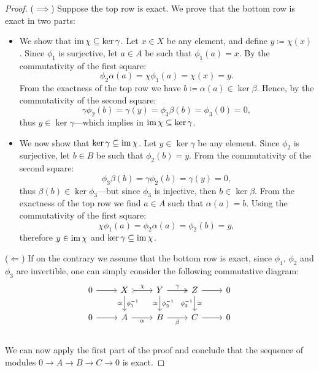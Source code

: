 \begin{proof}
    (\(\implies\)) Suppose the top row is exact. We prove that the bottom row is
    exact in two parts:
    \begin{itemize}\setlength\itemsep{0em}
        \item We show that \(\operatorname{im} \chi \subseteq \ker \gamma\). Let \(x \in X\) be any
              element, and define \(y \coloneq \chi(x)\). Since \(\phi_1\) is surjective,
              let \(a \in A\) be such that \(\phi_1(a) = x\). By the commutativity of the
              first square:
              \[
                  \phi_2 \alpha(a) = \chi \phi_1(a) = \chi(x) = y.
              \]
              From the exactness of the top row we have \(b \coloneq \alpha(a) \in \ker
              \beta\). Hence, by the commutativity of the second square:
              \[
                  \gamma \phi_2(b) = \gamma(y) = \phi_3 \beta(b) = \phi_3(0) = 0,
              \]
              thus \(y \in \ker \gamma\)---which implies in \(\operatorname{im} \chi \subseteq \ker
              \gamma\).
        \item We now show that \(\ker \gamma \subseteq \operatorname{im} \chi\). Let \(y \in \ker
              \gamma\) be any element. Since \(\phi_2\) is surjective, let \(b \in B\) be
              such that \(\phi_2(b) = y\). From the commutativity of the second square:
              \[
                  \phi_3 \beta(b) = \gamma \phi_2(b) = \gamma(y) = 0,
              \]
              thus \(\beta(b) \in \ker \phi_3\)---but since \(\phi_3\) is injective, then
              \(b \in \ker \beta\). From the exactness of the top row we find \(a \in A\)
              such that \(\alpha(a) = b\). Using the commutativity of the first square:
              \[
                  \chi \phi_1(a) = \phi_2 \alpha(a) = \phi_2(b) = y,
              \]
              therefore \(y \in \operatorname{im} \chi\) and \(\ker \gamma \subseteq \operatorname{im} \chi\).
    \end{itemize}

    (\(\Leftarrow\)) If on the contrary we assume that the bottom row is exact,
    since \(\phi_1\), \(\phi_2\) and \(\phi_3\) are invertible, one can simply
    consider the following commutative diagram:
    \[
        \begin{tikzcd}
            0 \ar[r]
            &X \ar[r, tail, "\chi"] \ar[d, "\dis"', "\phi_1^{-1}"]
            &Y \ar[r, two heads, "\gamma"]  \ar[d, "\dis"', "\phi_2^{-1}"]
            &Z \ar[r]           \ar[d, "\dis", "\phi_3^{-1}"']
            &0 \\
            0 \ar[r]
            &A \ar[r, "\alpha"']
            &B \ar[r, "\beta"']
            &C \ar[r]
            &0 \\
        \end{tikzcd}
    \]
    We can now apply the first part of the proof and conclude that the sequence of
    modules \(0 \to A \to B \to C \to 0\) is exact.
\end{proof}

